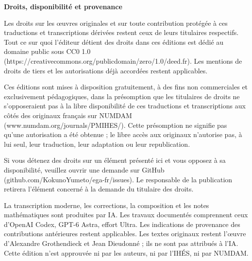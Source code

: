 \documentclass[10pt,oneside]{book}
\begin{document}
\clearpage
\begingroup
\small
\noindent\textbf{Droits, disponibilité et provenance}

Les droits sur les œuvres originales et sur toute contribution protégée à ces traductions et transcriptions dérivées restent ceux de leurs titulaires respectifs. Tout ce sur quoi l'éditeur détient des droits dans ces éditions est dédié au domaine public sous CC0 1.0 (https://creativecommons.org/publicdomain/zero/1.0/deed.fr). Les mentions de droits de tiers et les autorisations déjà accordées restent applicables.

Ces éditions sont mises à disposition gratuitement, à des fins non commerciales et exclusivement pédagogiques, dans la présomption que les titulaires de droits ne s'opposeraient pas à la libre disponibilité de ces traductions et transcriptions aux côtés des originaux français sur NUMDAM (www.numdam.org/journals/PMIHES/). Cette présomption ne signifie pas qu'une autorisation a été obtenue ; le libre accès aux originaux n'autorise pas, à lui seul, leur traduction, leur adaptation ou leur republication.

Si vous détenez des droits sur un élément présenté ici et vous opposez à sa disponibilité, veuillez ouvrir une demande sur GitHub (github.com/KokunoYumeto/ega-fr/issues). Le responsable de la publication retirera l'élément concerné à la demande du titulaire des droits.

La transcription moderne, les corrections, la composition et les notes mathématiques sont produites par IA. Les travaux documentés comprennent ceux d'OpenAI Codex, GPT-6 Astra, effort Ultra. Les indications de provenance des contributions antérieures restent applicables. Les textes originaux restent l'œuvre d'Alexandre Grothendieck et Jean Dieudonné ; ils ne sont pas attribués à l'IA. Cette édition n'est approuvée ni par les auteurs, ni par l'IHÉS, ni par NUMDAM.
\par
\endgroup
\clearpage





\clearpage
\setcounter{section}{0}
\setcounter{subsection}{0}
\setcounter{equation}{0}
\setcounter{footnote}{0}




















\clearpage
\setcounter{section}{5}
\setcounter{subsection}{0}
\setcounter{equation}{0}
\setcounter{footnote}{0}


\end{document}
